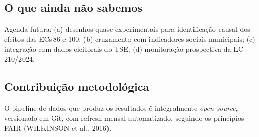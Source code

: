 \documentclass[12pt,a4paper,oneside]{article}
\begin{document}
\subsection{O que ainda não sabemos}

Agenda futura: (a) desenhos quase-experimentais para identificação
causal dos efeitos das ECs\,86 e 100; (b) cruzamento com indicadores
sociais municipais; (c) integração com dados eleitorais do TSE; (d)
monitoração prospectiva da LC\,210/2024.

\subsection{Contribuição metodológica}

O pipeline de dados que produz os resultados é integralmente
\textit{open-source}, versionado em Git, com refresh mensal
automatizado, seguindo os princípios FAIR (WILKINSON et al., 2016).

\end{document}
